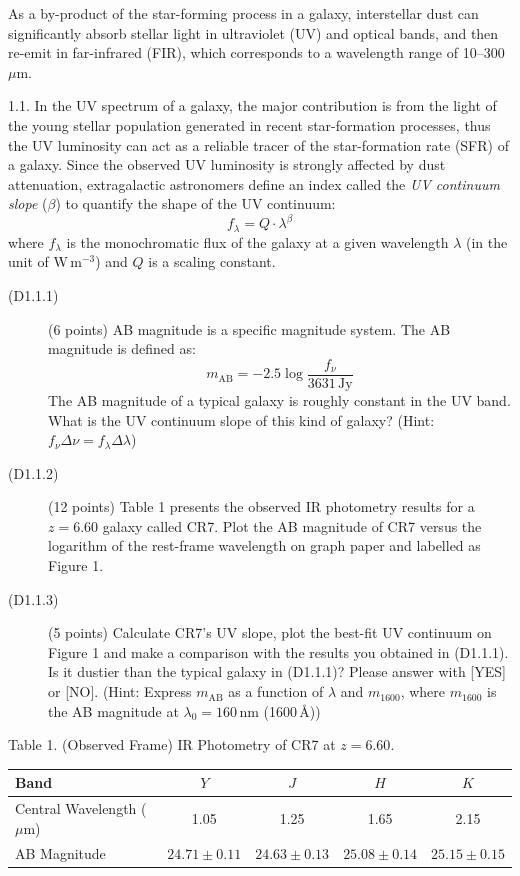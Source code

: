 As a by-product of the star-forming process in a galaxy, interstellar dust can
significantly absorb stellar light in ultraviolet (UV) and optical bands, and
then re-emit in far-infrared (FIR), which corresponds to a wavelength range of
10--300\,$\mu$m.

1.1. In the UV spectrum of a galaxy, the major contribution is from the light
of the young stellar population generated in recent star-formation processes,
thus the UV luminosity can act as a reliable tracer of the star-formation rate
(SFR) of a galaxy. Since the observed UV luminosity is strongly affected by
dust attenuation, extragalactic astronomers define an index called the
\emph{UV continuum slope} ($\beta$) to quantify the shape of the UV continuum:
\[ f_\lambda = Q \cdot \lambda^\beta \]
where $f_\lambda$ is the monochromatic flux of the galaxy at a given
wavelength $\lambda$ (in the unit of W\,m$^{-3}$) and $Q$ is a scaling
constant.

\begin{description}
\item[(D1.1.1)] (6 points) AB magnitude is a specific magnitude system. The AB
  magnitude is defined as:
  \[ m_{\mathrm{AB}} = -2.5 \log \frac{f_\nu}{3631\,\mathrm{Jy}} \]
  The AB magnitude of a typical galaxy is roughly constant in the UV band.
  What is the UV continuum slope of this kind of galaxy? (Hint:
  $f_\nu \Delta\nu = f_\lambda \Delta\lambda$)
\item[(D1.1.2)] (12 points) Table 1 presents the observed IR photometry
  results for a $z = 6.60$ galaxy called CR7. Plot the AB magnitude of CR7
  versus the logarithm of the rest-frame wavelength on graph paper and
  labelled as Figure 1.
\item[(D1.1.3)] (5 points) Calculate CR7's UV slope, plot the best-fit UV
  continuum on Figure 1 and make a comparison with the results you obtained in
  (D1.1.1). Is it dustier than the typical galaxy in (D1.1.1)? Please answer
  with [YES] or [NO]. (Hint: Express $m_{\mathrm{AB}}$ as a function of
  $\lambda$ and $m_{1600}$, where $m_{1600}$ is the AB magnitude at
  $\lambda_0 = 160$\,nm (1600\,\AA))
\end{description}

Table 1. (Observed Frame) IR Photometry of CR7 at $z = 6.60$.

\begin{center}
\begin{tabular}{l|c|c|c|c}
Band & $Y$ & $J$ & $H$ & $K$ \\
\hline
Central Wavelength ($\mu$m) & 1.05 & 1.25 & 1.65 & 2.15 \\
AB Magnitude & $24.71 \pm 0.11$ & $24.63 \pm 0.13$ & $25.08 \pm 0.14$
  & $25.15 \pm 0.15$ \\
\end{tabular}
\end{center}


